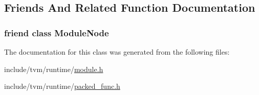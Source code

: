 \subsection{Friends And Related Function Documentation}
\subsubsection[{\texorpdfstring{Module\+Node}{ModuleNode}}]{\setlength{\rightskip}{0pt plus 5cm}friend class {\bf Module\+Node}\hspace{0.3cm}{\ttfamily [friend]}}\hypertarget{classtvm_1_1runtime_1_1Module_a908d19538a4fcadd6e93f39e4aa5292b}{}\label{classtvm_1_1runtime_1_1Module_a908d19538a4fcadd6e93f39e4aa5292b}


The documentation for this class was generated from the following files\+:\begin{DoxyCompactItemize}
\item 
include/tvm/runtime/\hyperlink{runtime_2module_8h}{module.\+h}\item 
include/tvm/runtime/\hyperlink{packed__func_8h}{packed\+\_\+func.\+h}\end{DoxyCompactItemize}
